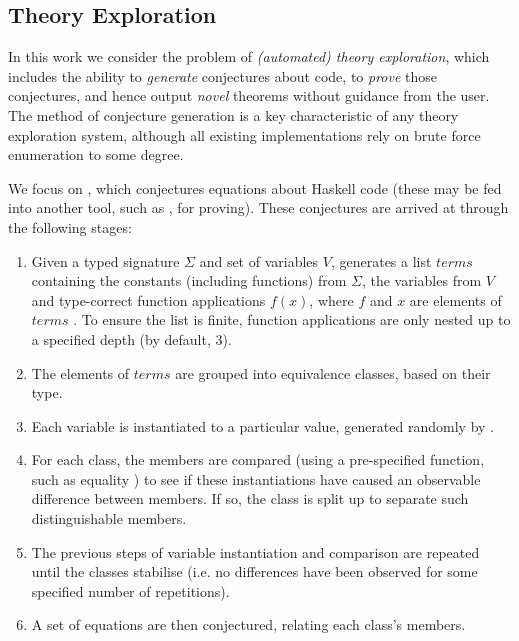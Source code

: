 \subsection{Theory Exploration}
\label{sec:theoryexploration}

In this work we consider the problem of \emph{(automated) theory exploration},
which includes the ability to \emph{generate} conjectures about code, to
\emph{prove} those conjectures, and hence output \emph{novel} theorems without
guidance from the user. The method of conjecture generation is a key
characteristic of any theory exploration system, although all existing
implementations rely on brute force enumeration to some degree.

We focus on \qspec{} \cite{QuickSpec}, which conjectures equations about
Haskell code (these may be fed into another tool, such as \hspec{}, for
proving). These conjectures are arrived at through the following stages:

\iffalse TODO: Make this more formal?
 V \in Var
 F \in Fun
 T \in Term
 T ::= V | F | T1 T2

 Term ::= VAR | Const | Fun (Term)
or
 Term t ::= x | f | t t'
\fi

\begin{enumerate}
\item Given a typed signature $\Sigma$ and set of variables $V$, \qspec{}
  generates a list $terms$ containing the constants (including functions) from
  $\Sigma$, the variables from $V$ and type-correct function applications
  $f(x)$, where $f$ and $x$ are elements of $terms$ \iffalse TODO: A little
  awkward; maybe use the above notation? \fi. To ensure the list is finite,
  function applications are only nested up to a specified depth (by default, 3).
\item The elements of $terms$ are grouped into equivalence classes, based on
  their type.
\item Each variable is instantiated to a particular value, generated randomly by
  \qcheck{}.
\item For each class, the members are compared (using a pre-specified function,
  such as equality \hs{==}) to see if these instantiations have caused an
  observable difference between members. If so, the class is split up to
  separate such distinguishable members.
\item The previous steps of variable instantiation and comparison are repeated
  until the classes stabilise (i.e. no differences have been observed for some
  specified number of repetitions).
\item A set of equations are then conjectured, relating each class's members.
\end{enumerate}

